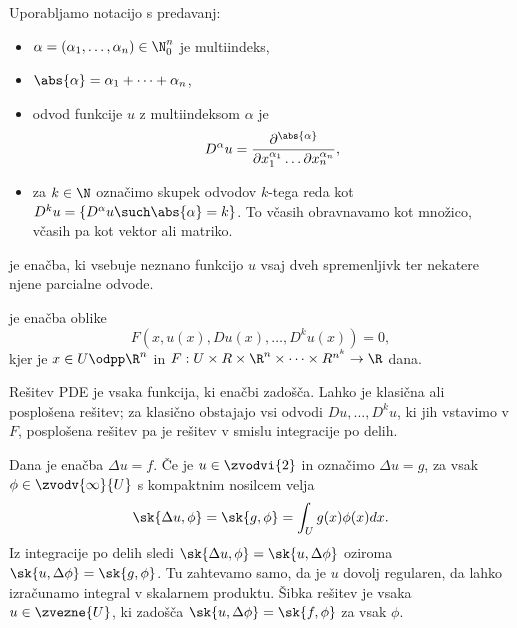 
Uporabljamo notacijo s predavanj:
\begin{itemize}
\item $\alpha = (\alpha_1, \ldots, \alpha_n) \in \N_0^n$ je multiindeks,
\item $\abs{\alpha} = \alpha_1 + \cdots + \alpha_n$,
\item odvod funkcije $u$ z multiindeksom $\alpha$ je
  \[
	D^\alpha u = \frac{\partial^{\abs{\alpha}}}{\partial x_1^{\alpha_1} \ldots
	  \partial x_n^{\alpha_n}},
  \]
\item za $k \in \N$ označimo skupek odvodov $k$-tega reda kot $D^k u =
  \{D^\alpha u \such \abs{\alpha} = k\}$.
  To včasih obravnavamo kot množico, včasih pa kot vektor ali matriko.
\end{itemize}

\begin{definicija}
   je enačba, ki vsebuje neznano funkcijo
  $u$ vsaj dveh spremenljivk ter nekatere njene parcialne odvode.
\end{definicija}

\begin{definicija}
   je enačba oblike
  \[
	F(x, u(x), D u(x), \ldots, D^k u(x)) = 0,
  \]
  kjer je $x \in U\odpp\R^n$ in $F: U \times R \times \R^n \times \cdots \times
  R^{n^k} \to \R$ dana.
\end{definicija}

Rešitev PDE je vsaka funkcija, ki enačbi zadošča.
Lahko je klasična ali posplošena rešitev; za klasično obstajajo vsi odvodi $Du,
\ldots, D^k u$, ki jih vstavimo v $F$, posplošena rešitev pa je rešitev v smislu
integracije po delih.

\begin{primer}
  Dana je enačba $\Delta u = f$.
  Če je $u \in \zvodvi{2}$ in označimo $\Delta u = g$, za vsak $\phi \in
  \zvodv{\infty}{U}$ s kompaktnim nosilcem velja
  \[
	\sk{\Delta u, \phi} = \sk{g, \phi} = \int_U g(x) \phi(x) dx.
  \]
  Iz integracije po delih sledi $\sk{\Delta u, \phi} = \sk{u, \Delta \phi}$
  oziroma $\sk{u, \Delta \phi} = \sk{g, \phi}$.
  Tu zahtevamo samo, da je $u$ dovolj regularen, da lahko izračunamo integral v
  skalarnem produktu.
  Šibka rešitev je vsaka $u \in \zvezne{U}$, ki zadošča $\sk{u, \Delta \phi} =
  \sk{f, \phi}$ za vsak $\phi$.
\end{primer}


